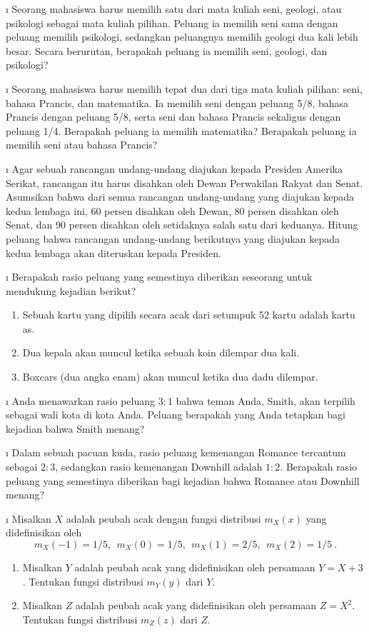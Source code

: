 \begin{LJSItem}
\i\label{exer 1.2.8} Seorang mahasiswa harus memilih satu dari mata kuliah seni,
geologi, atau psikologi
sebagai mata kuliah pilihan.  Peluang ia memilih seni sama dengan peluang memilih psikologi, sedangkan peluangnya
memilih geologi dua kali lebih besar.  Secara berurutan, berapakah peluang ia
memilih seni, geologi, dan psikologi?

\i\label{exer 1.2.9} Seorang mahasiswa harus memilih tepat dua dari tiga mata kuliah
pilihan: seni, bahasa Prancis,
dan matematika.  Ia memilih seni dengan peluang 5/8, bahasa Prancis dengan
peluang
5/8, serta seni dan bahasa Prancis sekaligus dengan peluang 1/4.  Berapakah
peluang
ia memilih matematika?  Berapakah peluang ia memilih seni
atau bahasa Prancis?

\i\label{exer 1.2.10} Agar sebuah rancangan undang-undang diajukan kepada Presiden
Amerika Serikat, rancangan itu harus
disahkan oleh Dewan Perwakilan Rakyat dan Senat.  Asumsikan bahwa dari
semua
rancangan undang-undang yang diajukan kepada kedua lembaga ini, 60 persen disahkan oleh Dewan, 80
persen
disahkan oleh Senat, dan 90 persen disahkan oleh setidaknya salah satu dari keduanya.  Hitung
peluang bahwa rancangan undang-undang berikutnya yang diajukan kepada kedua lembaga akan diteruskan kepada
Presiden.

\i\label{exer 1.2.11} Berapakah rasio peluang yang semestinya diberikan seseorang untuk mendukung
kejadian berikut?
\begin{enumerate}
\item Sebuah kartu yang dipilih secara acak dari setumpuk 52 kartu adalah kartu as.
\item Dua kepala akan muncul ketika sebuah koin dilempar dua kali.
\item Boxcars (dua angka enam) akan muncul ketika dua dadu dilempar.
\end{enumerate}

\i\label{exer 1.2.12} Anda menawarkan rasio peluang $3 : 1$ bahwa teman Anda, Smith, akan
terpilih sebagai wali kota
di kota Anda.  Peluang berapakah yang Anda tetapkan bagi kejadian bahwa Smith
menang?

\i\label{exer 1.2.13} Dalam sebuah pacuan kuda, rasio peluang kemenangan Romance
tercantum sebagai $2 :
3$, sedangkan rasio kemenangan Downhill adalah $1 : 2$.  Berapakah rasio peluang yang semestinya diberikan bagi
kejadian bahwa Romance atau Downhill menang?

\i\label{exer 1.2.13.1} Misalkan $X$ adalah peubah acak dengan fungsi distribusi
$m_X(x)$ yang didefinisikan oleh
$$
m_X(-1) = 1/5,\ \  m_X(0) = 1/5,\ \ m_X(1) = 2/5,\ \  m_X(2) = 1/5\ .
$$
\begin{enumerate}
\item Misalkan $Y$ adalah peubah acak yang didefinisikan oleh persamaan $Y = X + 3$.  Tentukan
fungsi distribusi $m_Y(y)$ dari $Y$.
\item Misalkan $Z$ adalah peubah acak yang didefinisikan oleh persamaan $Z = X^2$.  Tentukan 
fungsi distribusi $m_Z(z)$ dari $Z$.
\end{enumerate}


\end{LJSItem}
